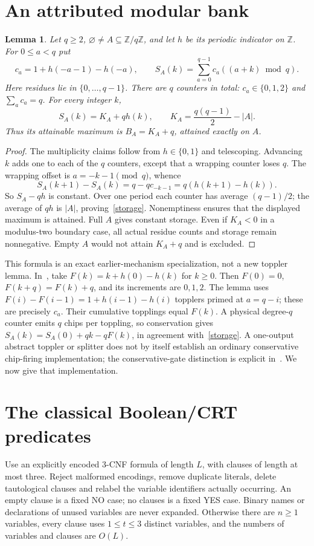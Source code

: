\documentclass[11pt]{article}
\newtheorem{lemma}{Lemma}
\newcommand{\Z}{\mathbb Z}
\begin{document}
\section{An attributed modular bank}
\begin{lemma}\label{bank}
Let $q\ge2$, $\varnothing\ne A\subseteq\Z/q\Z$, and let $h$ be its periodic
indicator on $\Z$. For $0\le a<q$ put
\[
 c_a=1+h(-a-1)-h(-a),\qquad
 S_A(k)=\sum_{a=0}^{q-1}c_a((a+k)\bmod q).
\]
Here residues lie in $\{0,\ldots,q-1\}$. There are $q$ counters in total:
$c_a\in\{0,1,2\}$ and $\sum_a c_a=q$. For every integer $k$,
\begin{equation}\label{storage}
 S_A(k)=K_A+q h(k),\qquad K_A=\frac{q(q-1)}2-|A|.
\end{equation}
Thus its attainable maximum is $B_A=K_A+q$, attained exactly on $A$.
\end{lemma}
\begin{proof}
The multiplicity claims follow from $h\in\{0,1\}$ and telescoping. Advancing
$k$ adds one to each of the $q$ counters, except that a wrapping counter loses
$q$. The wrapping offset is $a=-k-1\pmod q$, whence
\[
 S_A(k+1)-S_A(k)=q-qc_{-k-1}=q(h(k+1)-h(k)).
\]
So $S_A-qh$ is constant. Over one period each counter has average $(q-1)/2$;
the average of $qh$ is $|A|$, proving~\eqref{storage}. Nonemptiness ensures
that the displayed maximum is attained. Full $A$ gives constant storage.
Even if $K_A<0$ in a modulus-two boundary case, all actual residue counts and
storage remain nonnegative. Empty $A$ would not attain $K_A+q$ and is excluded.
\end{proof}

This formula is an exact earlier-mechanism specialization, not a new toppler
lemma. In~\cite[Lemma~4.1]{HLW}, take
$F(k)=k+h(0)-h(k)$ for $k\ge0$. Then $F(0)=0$,
$F(k+q)=F(k)+q$, and its increments are $0,1,2$. The lemma uses
$F(i)-F(i-1)=1+h(i-1)-h(i)$ topplers primed at $a=q-i$; these are precisely
$c_a$. Their cumulative topplings equal $F(k)$. A physical degree-$q$ counter
emits $q$ chips per toppling, so conservation gives
$S_A(k)=S_A(0)+qk-qF(k)$, in agreement with~\eqref{storage}.
A one-output abstract toppler or splitter does not by itself establish an
ordinary conservative chip-firing implementation; the conservative-gate
distinction is explicit in~\cite[\S8.3]{HLW}. We now give that implementation.

\section{The classical Boolean/CRT predicates}
Use an explicitly encoded 3-CNF formula of length $L$, with clauses of length
at most three. Reject malformed encodings, remove duplicate literals, delete
tautological clauses and relabel the variable identifiers actually occurring.
An empty clause is a fixed NO case; no clauses is a fixed YES case. Binary
names or declarations of unused variables are never expanded. Otherwise
there are $n\ge1$ variables, every clause uses $1\le t\le3$ distinct variables,
and the numbers of variables and clauses are $O(L)$.
\end{document}
